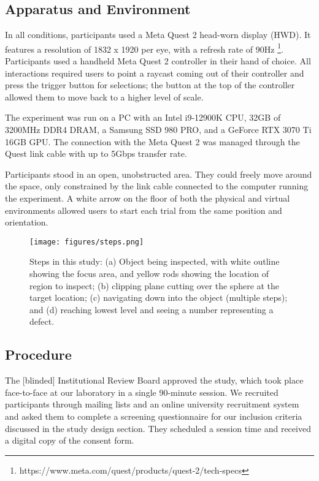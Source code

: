 \subsection{Apparatus and Environment}
In all conditions, participants used a Meta Quest 2 head-worn display (HWD). It features a resolution of 1832 x 1920 per eye, with a refresh rate of 90Hz \footnote{https://www.meta.com/quest/products/quest-2/tech-specs}. Participants used a handheld Meta Quest 2 controller in their hand of choice. All interactions required users to point a raycast coming out of their controller and press the trigger button for selections; the button at the top of the controller allowed them to move back to a higher level of scale.

The experiment was run on a PC with an Intel i9-12900K CPU, 32GB of 3200MHz DDR4 DRAM, a Samsung SSD 980 PRO, and a GeForce RTX 3070 Ti 16GB GPU. The connection with the Meta Quest 2 was managed through the Quest link cable with up to 5Gbps transfer rate.

Participants stood in an open, unobstructed area. They could freely move around the space, only constrained by the link cable connected to the computer running the experiment. A white arrow on the floor of both the physical and virtual environments allowed users to start each trial from the same position and orientation.

\begin{figure}[tb]
 \centering
 \texttt{[image: figures/steps.png]}
 \caption{Steps in this study: (a) Object being inspected, with white outline showing the focus area, and yellow rods showing the location of region to inspect; (b) clipping plane cutting over the sphere at the target location; (c) navigating down into the object (multiple steps); and (d) reaching lowest level and seeing a number representing a defect.}
 \label{fig:steps}
 \vspace{-4mm}
\end{figure}

\subsection{Procedure}
The [blinded] Institutional Review Board approved the study, which took place face-to-face at our laboratory in a single 90-minute session. We recruited participants through mailing lists and an online university recruitment system and asked them to complete a screening questionnaire for our inclusion criteria discussed in the study design section. They scheduled a session time and received a digital copy of the consent form.

